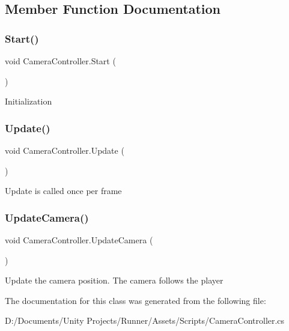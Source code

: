 \subsection{Member Function Documentation}
\mbox{\label{class_camera_controller_ad4a238c6f7db3ee003302a245d860860}} 
\subsubsection{\texorpdfstring{Start()}{Start()}}
{\footnotesize\ttfamily void Camera\+Controller.\+Start (\begin{DoxyParamCaption}{ }\end{DoxyParamCaption})\hspace{0.3cm}{\ttfamily [private]}}

Initialization \mbox{\label{class_camera_controller_a7c4f486f4bcbd1d54a346fdce9707bd5}} 
\subsubsection{\texorpdfstring{Update()}{Update()}}
{\footnotesize\ttfamily void Camera\+Controller.\+Update (\begin{DoxyParamCaption}{ }\end{DoxyParamCaption})\hspace{0.3cm}{\ttfamily [private]}}

Update is called once per frame \mbox{\label{class_camera_controller_ab397f3c39a112546283ad6b63fbf04ec}} 
\subsubsection{\texorpdfstring{Update\+Camera()}{UpdateCamera()}}
{\footnotesize\ttfamily void Camera\+Controller.\+Update\+Camera (\begin{DoxyParamCaption}{ }\end{DoxyParamCaption})\hspace{0.3cm}{\ttfamily [private]}}

Update the camera position. The camera follows the player 

The documentation for this class was generated from the following file\+:\begin{DoxyCompactItemize}
\item 
D\+:/\+Documents/\+Unity Projects/\+Runner/\+Assets/\+Scripts/Camera\+Controller.\+cs\end{DoxyCompactItemize}
